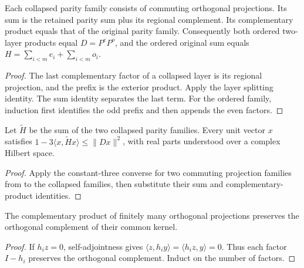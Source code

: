 \begin{lemma}
    \label{lem:alvv_ff_detectability_identity}
    \leanok
    Each collapsed parity family consists of commuting orthogonal
    projections. Its sum is the retained parity sum plus its regional
    complement. Its complementary product equals that of the original
    parity family. Consequently both ordered two-layer products equal
    $D=P^eP^o$, and the ordered original sum equals
    $H=\sum_{i<m}e_i+\sum_{i<m}o_i$.
\end{lemma}
\begin{proof}\leanok
    The last complementary factor of a collapsed layer is its regional
    projection, and the prefix is the exterior product. Apply the layer
    splitting identity. The sum identity separates the last term.
    For the ordered family, induction first identifies the odd prefix
    and then appends the even factors.
\end{proof}

\begin{lemma}
    \label{lem:alvv_ff_collapsed_converse}
    \leanok
    Let $\widetilde H$ be the sum of the two collapsed parity families.
    Every unit vector $x$ satisfies
    $1-3\langle x,\widetilde Hx\rangle\le\|Dx\|^2$,
    with real parts understood over a complex Hilbert space.
\end{lemma}
\begin{proof}\leanok
    Apply the constant-three converse for two commuting projection
    families from \cite{QICLean2026Blueprint} to the collapsed families,
    then substitute their sum and complementary-product identities.
\end{proof}

\begin{lemma}
    \label{lem:alvv_ff_orthogonal_preservation}
    \leanok
    The complementary product of finitely many orthogonal projections
    preserves the orthogonal complement of their common kernel.
\end{lemma}
\begin{proof}\leanok
    If $h_iz=0$, self-adjointness gives
    $\langle z,h_iy\rangle=\langle h_iz,y\rangle=0$.
    Thus each factor $I-h_i$ preserves the orthogonal complement.
    Induct on the number of factors.
\end{proof}

